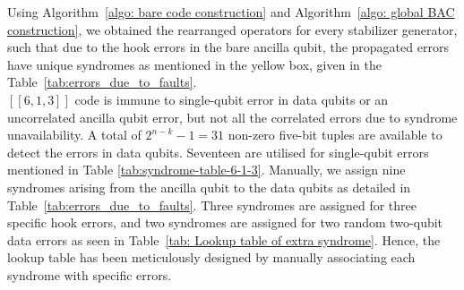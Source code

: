 \documentclass[reprint, amsmath,amssymb, aps,pra,
 floatfix,
]{revtex4-2}
\begin{document}
\noindent Using Algorithm~\ref{algo: bare code construction} and Algorithm~\ref{algo: global BAC construction}, we obtained the rearranged operators for every stabilizer generator, such that due to the hook errors in the bare ancilla qubit, the propagated errors have unique syndromes as mentioned in the yellow box, given in the Table~\ref{tab:errors_due_to_faults}.\\



\noindent  $[[6,1,3]]$ code is immune to single-qubit error in data qubits or an uncorrelated ancilla qubit error, but not all the correlated errors due to syndrome unavailability.
A total of $2^{n-k}-1=31$ non-zero five-bit tuples are available to detect the errors in data qubits. Seventeen are utilised for single-qubit errors mentioned in Table \ref{tab:syndrome-table-6-1-3}. Manually, we assign nine syndromes arising from the ancilla qubit to the data qubits as detailed in Table~\ref{tab:errors_due_to_faults}. 
Three syndromes are assigned for three specific hook errors, and two syndromes are assigned for two random two-qubit data errors as seen in Table~\ref{tab: Lookup table of extra syndrome}. 
Hence, the lookup table has been meticulously designed by manually associating each syndrome with specific errors.
\end{document}
